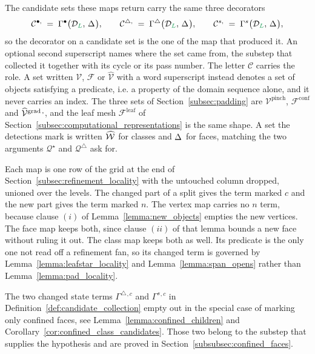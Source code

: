 \documentclass[a4paper, 12pt]{article}
\makeatletter
\newcommand{\quadriF}{\mathcal{Q}^{\triangle}}                   %
\newcommand{\quadriV}{\mathcal{Q}^{\star}}                       %
\newcommand{\collectV}{\Gamma^{\bullet}}                         %
\newcommand{\collectF}{\Gamma^{\triangle}}                       %
\newcommand{\collectC}{\Gamma^{s}}                               %
\DeclareRobustCommand{\gradeClasses}[1][]{\widehat{\V}^{\mathrm{grad} \, \ifx\@empty#1\@empty\else,#1\fi}}
\DeclareRobustCommand{\candV}[1][]{\mathcal{C}^{\bullet\ifx\@empty#1\@empty\else,#1\fi}}
\DeclareRobustCommand{\candF}[1][]{\mathcal{C}^{\triangle\ifx\@empty#1\@empty\else,#1\fi}}
\DeclareRobustCommand{\candC}[1][]{\mathcal{C}^{s\ifx\@empty#1\@empty\else,#1\fi}}
\newcommand{\quadriVup}[1]{\quadriV_{\rightarrow #1}}            %
\newcommand{\green}{\color{ForestGreen}}
\newcommand{\V}{\mathcal{V}}
\newcommand{\F}{\mathcal{F}}
\DeclareRobustCommand{\simplexsubsetTwo}[2][]{\Delta\ifx\@empty#1\@empty\else^{#1}\fi_{#2}}
\newcommand{\vertexClasses}{\widehat{\V}}
\DeclareRobustCommand{\markedVertexClasses}[1][]{\widehat{\mathcal{W}}\ifx\@empty#1\@empty\else^{#1}\fi}
\renewcommand{\L}{{\green L}}
\theoremstyle{definition}
\theoremstyle{plain}
\numberwithin{equation}{section}
\newcommand{\tobecut}[1]{{\color{red} #1}}     %
\DeclareRobustCommand{\domseq}[1][]{\mathcal{D}\ifx\@empty#1\@empty\else_{#1}\fi}
\newcommand{\leafMesh}{\F^{\mathrm{leaf}}}                  %
\makeatother
\begin{document}
The candidate sets these maps return carry the same three decorators
\begin{equation}
    \label{eq:candidate_sets}
    \candV \; = \; \collectV \big( \domseq[\L], \, \simplexsubsetTwo{} \big), \qquad
    \candF \; = \; \collectF \big( \domseq[\L], \, \simplexsubsetTwo{} \big), \qquad
    \candC \; = \; \collectC \big( \domseq[\L], \, \simplexsubsetTwo{} \big),
\end{equation}
so the decorator on a candidate set is the one of the map that produced it. An optional second superscript names where the set came from, the substep that collected it together with its cycle or its pass number. The letter $\mathcal{C}$ carries the role. A set written $\V$, $\F$ or $\vertexClasses$ with a word superscript instead denotes a set of objects satisfying a predicate, i.e. a property of the domain sequence alone, and it never carries an index. The three sets of Section~\ref{subsec:padding} are $\V^{\mathrm{pinch}}$, $\F^{\mathrm{conf}}$ and $\gradeClasses$, and the leaf mesh $\leafMesh$ of Section~\ref{subsec:computational_representations} is the same shape. A set the detections mark is written $\markedVertexClasses$ for classes and $\simplexsubsetTwo{}$ for faces, matching the two arguments $\quadriV$ and $\quadriF$ ask for.

\smallskip

Each map is one row of the grid at the end of Section~\ref{subsec:refinement_locality} with the untouched column dropped, unioned over the levels. The changed part of a split gives the term marked $c$ and the new part gives the term marked $n$. The vertex map carries no $n$ term, because clause $(i)$ of Lemma~\ref{lemma:new_objects} empties the new vertices. The face map keeps both, since clause $(ii)$ of that lemma bounds a new face without ruling it out. The class map keeps both as well. Its predicate is the only one not read off a refinement fan, so its changed term is governed by Lemma~\ref{lemma:leafstar_locality} and Lemma~\ref{lemma:span_opens} rather than Lemma~\ref{lemma:pad_locality}.

The two changed state terms $\collectF{}^{,c}$ and $\collectC{}^{,c}$ in Definition~\ref{def:candidate_collection} empty out in the special case of marking only confined faces, see Lemma~\ref{lemma:confined_children} and Corollary~\ref{cor:confined_class_candidates}. Those two belong to the substep that supplies the hypothesis and are proved in Section~\ref{subsubsec:confined_faces}.

\smallskip
\end{document}
